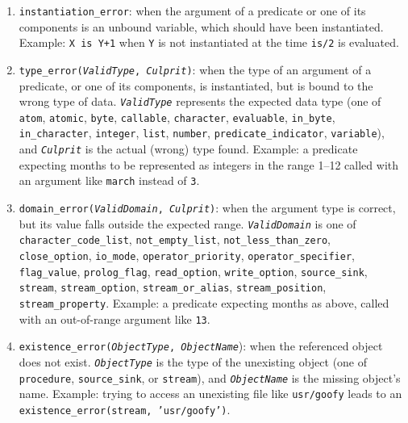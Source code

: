 \begin{enumerate}
  \item \texttt{instantiation\_error}: when the argument of a predicate or one of its components is an unbound variable, which should have been instantiated. Example: \texttt{X is Y+1} when \texttt{Y} is not instantiated at the time \texttt{is/2} is evaluated.

  \item \texttt{type\_error(\textit{ValidType}, \textit{Culprit})}: when the type of an argument of a predicate, or one of its components, is instantiated, but is bound to the wrong type of data. \texttt{\textit{ValidType}} represents the expected data type (one of \texttt{atom}, \texttt{atomic}, \texttt{byte}, \texttt{callable}, \texttt{character}, \texttt{evaluable}, \texttt{in\_byte}, \texttt{in\_character}, \texttt{integer}, \texttt{list}, \texttt{number}, \texttt{predicate\_indicator}, \texttt{variable}), and \texttt{\textit{Culprit}} is the actual (wrong) type found.
      Example: a predicate expecting months to be represented as integers in the range 1--12 called with an argument like \texttt{march} instead of \texttt{3}.

  \item \texttt{domain\_error(\textit{ValidDomain}, \textit{Culprit})}: when the argument type is correct, but its value falls outside the expected range.
      \texttt{\textit{ValidDomain}} is one of \texttt{character\_code\_list},
      \texttt{not\_empty\_list}, \texttt{not\_less\_than\_zero}, \texttt{close\_option}, \texttt{io\_mode}, \texttt{operator\_priority}, \texttt{operator\_specifier}, \texttt{flag\_value}, \texttt{prolog\_flag}, \texttt{read\_option}, \texttt{write\_option}, \texttt{source\_sink}, \texttt{stream}, \texttt{stream\_option}, \texttt{stream\_or\_alias}, \texttt{stream\_position},\\
      \texttt{stream\_property}. Example: a predicate expecting months as above, called with an out-of-range argument like \texttt{13}.

  \item \texttt{existence\_error(\textit{ObjectType}, \textit{ObjectName}}): when the referenced object does not exist. \texttt{\textit{ObjectType}} is
      the type of the unexisting object (one of \texttt{procedure}, \texttt{source\_sink}, or \texttt{stream}), and \texttt{\textit{ObjectName}} is the missing object's name. Example: trying to access an unexisting file like \texttt{usr/goofy} leads to an
      \texttt{existence\_error(stream, 'usr/goofy')}.


\end{enumerate}
